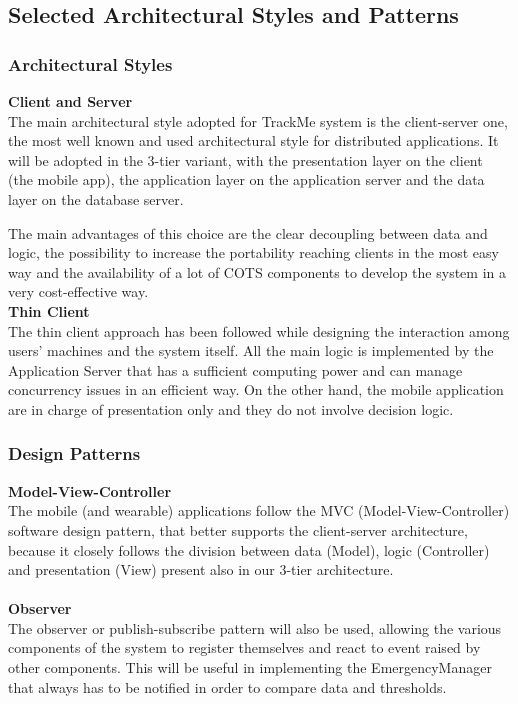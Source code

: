 
%

\subsection{Selected Architectural Styles and Patterns}
\subsubsection{Architectural Styles}
\hspace{-\parindent}\textbf{Client and Server}\\

The main architectural style adopted for TrackMe system is the client-server one, the most well known and used architectural style for distributed applications. It will be adopted in the 3-tier variant, with the presentation layer on the client (the mobile app), the application layer on the application server and the data layer on the database server.

The main advantages of this choice are the clear decoupling between data and logic, the possibility to increase the portability reaching clients in the most easy way and the availability of a lot of COTS components to  develop the system in a very cost-effective way.\\

\hspace{-\parindent}\textbf{Thin Client}\\

The thin client approach has been followed while designing the interaction among users’ machines and the system itself. All the main logic is implemented by the Application Server that has a sufficient computing power and can manage concurrency issues in an efficient way. On the other hand, the mobile application are in charge of presentation only and they do not involve decision logic.

\subsubsection{Design Patterns}
\textbf{Model-View-Controller}\\

The mobile (and wearable) applications follow the MVC (Model-View-Controller) software design pattern, that better supports the client-server architecture, because it closely follows the division between data (Model), logic (Controller) and presentation (View) present also in our 3-tier architecture.\\
\\
\textbf{Observer}\\

The observer or publish-subscribe pattern will also be used, allowing the various components of the system to register themselves and react to event raised by other components. This will be useful in implementing the EmergencyManager that always has to be notified in order to compare data and thresholds.
\\

%